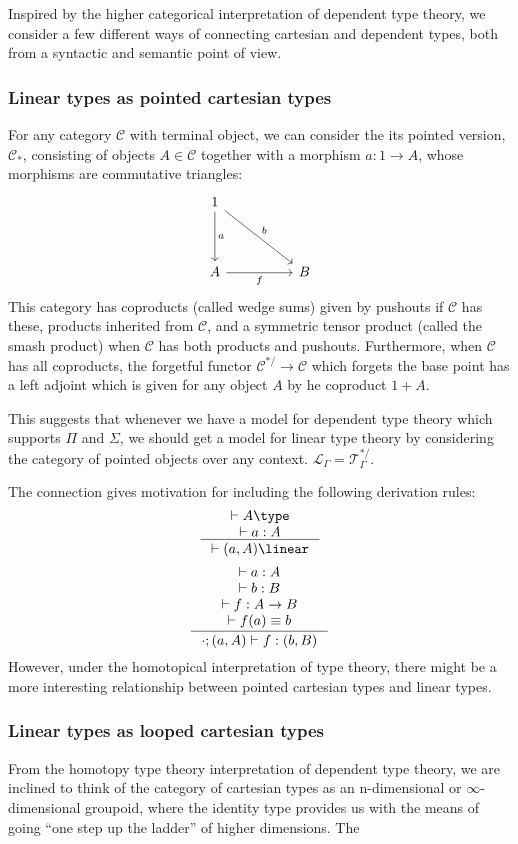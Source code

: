   Inspired by the higher categorical interpretation of dependent type theory, we consider a few different ways of connecting cartesian and dependent types, both from a syntactic and semantic point of view.
  \subsubsection{Linear types as pointed cartesian types}
  For any category $\mathcal{C}$ with terminal object, we can consider the its pointed version, $\mathcal{C}_*$, consisting of objects $A \in \mathcal{C}$ together with a morphism $a : 1 \to A$, whose morphisms are commutative triangles:
\[
  \ti
  1 \ar[d, "a"] \ar[dr, "b"] \\
  A \ar[r, "f",swap]& B
  \kz
\]
This category has coproducts (called wedge sums) given by pushouts if $\mathcal{C}$ has these, products inherited from $\mathcal{C}$, and a symmetric tensor product (called the smash product) when $\mathcal{C}$ has both products and pushouts. Furthermore, when $\mathcal{C}$ has all coproducts, the forgetful functor $\mathcal{C}^{*/} \to \mathcal{C}$ which forgets the base point has a left adjoint which is given for any object $A$ by he coproduct $1 + A$.

This suggests that whenever we have a model for dependent type theory which supports $\Pi$ and $\Sigma$, we should get a model for linear type theory by considering the category of pointed objects over any context. $\mathcal{L}_\Gamma = \mathcal{T}_\Gamma^{*/}$.

The connection gives motivation for including the following derivation rules:
  \[
  \inference{
    \vdash A \type\\
     \vdash a : A}
  {\vdash (a, A) \linear}
\]
\[
  \inference{
     \vdash a : A\\
     \vdash b : B\\
    \vdash f : A \to B\\
    \vdash f(a) \equiv b}
  {\cdot ; (a, A) \vdash f : (b, B)}
\]
However, under the homotopical interpretation of type theory, there might be a more interesting relationship between pointed cartesian types and linear types.
\subsubsection{Linear types as looped cartesian types}
From the homotopy type theory interpretation of dependent type theory, we are inclined to think of the category of cartesian types as an n-dimensional or $\infty$-dimensional groupoid, where the identity type provides us with the means of going ``one step up the ladder'' of higher dimensions. The 


